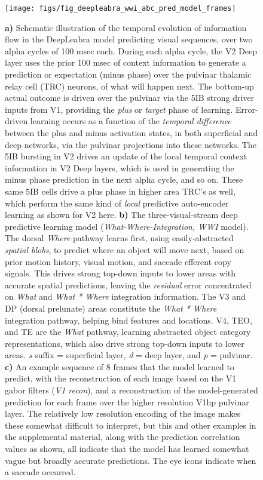 \documentclass[11pt,twoside]{article}
\newif\myifpdf
\begin{document}
\begin{figure}
  \centering\texttt{[image: figs/fig\_deepleabra\_wwi\_abc\_pred\_model\_frames]}
  \caption{\small {\bf a)} Schematic illustration of the temporal evolution of information flow in the DeepLeabra model predicting visual sequences, over two alpha cycles of 100 msec each.  During each alpha cycle, the V2 Deep layer uses the prior 100 msec of context information to generate a prediction or expectation (minus phase) over the pulvinar thalamic relay cell (TRC) neurons, of what will happen next.  The bottom-up actual outcome is driven over the pulvinar via the 5IB strong driver inputs from V1, providing the {\em plus} or {\em target} phase of learning.  Error-driven learning occurs as a function of the {\em temporal difference} between the plus and minus activation states, in both superficial and deep networks, via the pulvinar projections into these networks.  The 5IB bursting in V2 drives an update of the local temporal context information in V2 Deep layers, which is used in generating the minus phase prediction in the next alpha cycle, and so on.  These same 5IB cells drive a plus phase in higher area TRC's as well, which perform the same kind of {\em local} predictive auto-encoder learning as shown for V2 here.  {\bf b)} The three-visual-stream deep predictive learning model ({\em What-Where-Integration, WWI} model). The dorsal {\em Where} pathway learns first, using easily-abstracted {\em spatial blobs}, to predict where an object will move next, based on prior motion history, visual motion, and saccade efferent copy signals.  This drives strong top-down inputs to lower areas with accurate spatial predictions, leaving the {\em residual} error concentrated on {\em What} and {\em What * Where} integration information.  The V3 and DP (dorsal prelunate) areas constitute the {\em What * Where} integration pathway, helping bind features and locations.  V4, TEO, and TE are the {\em What} pathway, learning abstracted object category representations, which also drive strong top-down inputs to lower areas.  {\em s} suffix = superficial layer, {\em d} = deep layer, and {\em p} = pulvinar.  {\bf c)} An example sequence of 8 frames that the model learned to predict, with the reconstruction of each image based on the V1 gabor filters ({\em V1 recon}), and a reconstruction of the model-generated prediction for each frame over the higher resolution V1hp pulvinar layer.  The relatively low resolution encoding of the image makes these somewhat difficult to interpret, but this and other examples in the supplemental material, along with the prediction correlation values as shown, all indicate that the model has learned somewhat vague but broadly accurate predictions.  The eye icons indicate when a saccade occurred.}
  \label{fig.model}
\end{figure}
\end{document}
